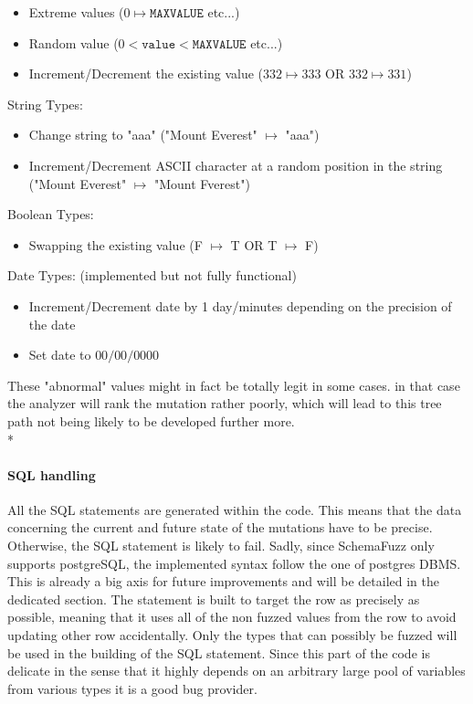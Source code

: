 \documentclass{article}
\begin{document}
\begin{empfile}
\begin{itemize}
					\item Extreme values ($0 \mapsto \texttt{MAXVALUE}$ etc...)
					\item Random value ($0<\texttt{value}<\texttt{MAXVALUE}$ etc...)
					\item Increment/Decrement the existing value ($332 \mapsto 333$ OR $332 \mapsto 331$)
				\end{itemize}
				String Types:
				\begin{itemize}
					\item Change string to "aaa" ("Mount Everest" $\mapsto$ "aaa")
					\item Increment/Decrement ASCII character at a random position in the string ("Mount Everest" $\mapsto$ "Mount Fverest")
				\end{itemize}
					Boolean Types:
				\begin{itemize}						
					\item Swapping the existing value (F $\mapsto$ T OR T $\mapsto$ F)
				\end{itemize}
					Date Types: (implemented but not fully functional)			
				\begin{itemize}
					\item Increment/Decrement date by 1 day/minutes depending on the precision of the date
					\item Set date to $00/00/0000$ 
				\end{itemize}
These "abnormal" values might in fact be totally legit in some cases. in that case the analyzer 
will rank the mutation rather poorly, which will lead to this tree path not being   likely to be developed further more.
				\\*
				\paragraph{SQL handling}
All the SQL statements are generated within the code. This means that the data concerning the current and future state of the mutations have to be   precise. Otherwise, the SQL statement is   likely to fail. Sadly, since SchemaFuzz only supports postgreSQL, the implemented syntax follow the one of postgres
DBMS. This is already a   big axis for future improvements and will be detailed in the dedicated section.
The statement is built to target the row as precisely as possible, meaning that it uses all of the non fuzzed values from the row to avoid updating other row accidentally. Only the types that can possibly be fuzzed will be used in the building of the SQL statement. Since this part of the code is   delicate in the sense that it highly depends on an arbitrary large pool of variables from various types it is a good bug provider. 
				

\end{empfile}
\end{document}
